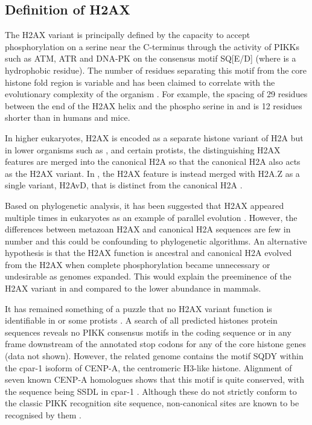 \subsection{Definition of H2AX}
\label{subsec:h2ax-review:relation-H2A-H2AX}
The H2AX variant is principally defined by the capacity to accept
phosphorylation on a serine near the C-terminus through the activity
of PIKKs such as ATM, ATR and DNA-PK on the consensus motif
SQ[E/D]\textPhi{} (where \textPhi{} is a hydrophobic residue). The number
of residues separating this motif from the core histone fold region is
variable and has been claimed to correlate with the evolutionary
complexity of the organism \citep{CRDP+02}. For example, the spacing
of 29 residues between the end of the H2AX  helix and the
phospho serine in  and
 is 12 residues shorter than in humans and
mice.

In higher eukaryotes, H2AX is encoded as a separate histone variant of
H2A but in lower organisms such as ,
 and certain protists, the distinguishing H2AX
features are merged into the canonical H2A \citep{HSM03,SJN06} so that
the canonical H2A also acts as the H2AX variant. In
, the H2AX feature is instead merged
with H2A.Z as a single variant, H2AvD, that is distinct from the
canonical H2A \citep{MCG02}.

Based on phylogenetic analysis, it has been suggested that H2AX
appeared multiple times in eukaryotes as an example of parallel
evolution \citep{HSM03}. However, the differences between metazoan
H2AX and canonical H2A sequences are few in number and this could be
confounding to phylogenetic algorithms. An alternative hypothesis is
that the H2AX function is ancestral and canonical H2A evolved from the
H2AX when complete phosphorylation became unnecessary or undesirable
as genomes expanded. This would explain the preeminence of the H2AX
variant in  and  compared
to the lower abundance in mammals.

It has remained something of a puzzle that no H2AX variant function is
identifiable in  \citep{HSM03} or some
protists \citep{SJN06}. A search of all predicted
 histones protein sequences reveals no PIKK
consensus motifs in the coding sequence or in any frame downstream of
the annotated stop codons for any of the core histone genes (data not
shown). However, the related  genome contains
the motif SQDY within the \mbox{cpar-1} isoform of \mbox{CENP-A},
the centromeric \mbox{H3-like} histone. Alignment of seven known
 \mbox{CENP-A} homologues shows that this
motif is quite conserved, with the sequence being SSDL in
 \mbox{cpar-1}
. Although these do not strictly
conform to the classic PIKK recognition site sequence, non-canonical
sites are known to be recognised by them \citep{SYC+05}.

